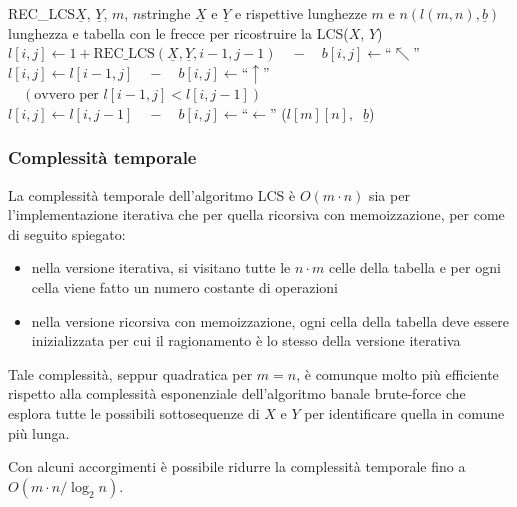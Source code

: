 \begin{algo}{REC\_LCS}{$\underline{X}$, $\underline{Y}$, $m$, $n$}{stringhe $\underline{X}$ e $\underline{Y}$ e rispettive lunghezze $m$ e $n$}{$(l(m, n), \underline{b})$ lunghezza e tabella con le frecce per ricostruire la LCS($X$, $Y$)}
	 
		 
			\State \(l[i, j] \gets 1 + \text{REC\_LCS}(\underline{X}, \underline{Y}, i-1, j-1) \quad-\quad b[i, j] \gets \text{``}\nwarrow\text{''}\)
		 
			\State \(l[i, j] \gets l[i-1, j] \quad-\quad b[i, j] \gets \text{``}\uparrow\text{''}\)
		\Else \(\quad (\text{ovvero per }l[i-1, j] < l[i, j-1])\) 
			\State \(l[i, j] \gets l[i, j-1] \quad-\quad b[i, j] \gets \text{``}\leftarrow\text{''}\)
		\EndIf
	\EndIf
	\State \Return (\(l[m][n], \;\; \underline{b}\))
\end{algo}

\newpage

\subsubsection*{Complessità temporale}
La complessità temporale dell'algoritmo LCS è \(O(m \cdot n)\) sia per l'implementazione iterativa che per quella ricorsiva
con memoizzazione, per come di seguito spiegato:
\begin{itemize}
	\item nella versione iterativa, si visitano tutte le \(n \cdot m\) celle della tabella e per ogni cella viene fatto
	un numero costante di operazioni
	\item nella versione ricorsiva con memoizzazione, ogni cella della tabella deve essere inizializzata per cui il
	ragionamento è lo stesso della versione iterativa
\end{itemize}
Tale complessità, seppur quadratica per \(m = n\), è comunque molto più efficiente rispetto alla complessità esponenziale
dell'algoritmo banale brute-force che esplora tutte le possibili sottosequenze di \(X\) e \(Y\) per identificare quella
in comune più lunga.

Con alcuni accorgimenti è possibile ridurre la complessità temporale fino a \(O(m \cdot n / \log_2 n)\).

